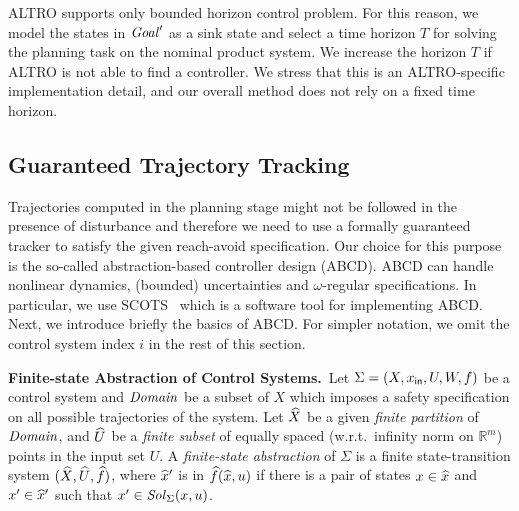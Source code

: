 \begin{remark}
	ALTRO supports only bounded horizon control problem.
	For this reason, we model the states in $\mathit{Goal}'$ as a sink state and select a time horizon $T$ for solving the planning task on the nominal product system. We increase the horizon $T$ if ALTRO is not able to find a controller.
	We stress that this is an ALTRO-specific implementation detail, and our overall method does not rely on a fixed time horizon.
\end{remark}



\subsection{Guaranteed Trajectory Tracking} 

Trajectories computed in the planning stage might not be followed in the presence of disturbance and therefore we need to use a 
formally guaranteed tracker to satisfy the given reach-avoid specification. 
Our choice for this purpose is the so-called abstraction-based controller design (ABCD). 
ABCD can handle nonlinear dynamics, (bounded) uncertainties and $\omega$-regular specifications. In particular, we use SCOTS~\cite{Rungger2016scots} which is a software tool for implementing ABCD. Next, we introduce briefly the basics of ABCD.
For simpler notation, we omit the control system index $i$ in the rest of this section.


\smallskip
\noindent\textbf{Finite-state Abstraction of Control Systems.}\
Let $\Sigma = (X,x_{\mathsf{in}}, U, W, f)$ be a control system and $\mathit{Domain}$ be a subset of $X$ which imposes a safety specification on all possible trajectories of the system. Let $\widehat{X}$ be a given \emph{finite partition} of $\mathit{Domain}$, and $\widehat{U}$ be a \emph{finite subset} of equally spaced (w.r.t.\ infinity norm on $\mathbb{R}^m$) points in the input set $U$.
A \emph{finite-state abstraction} of $\Sigma$ is a finite state-transition system $(\widehat{X},\widehat{U},\widehat{f})$, where $\widehat{x}'$ is in $\widehat{f}(\widehat{x},u)$ if there is a pair of states $x\in \widehat{x}$ and $x'\in \widehat{x}'$ such that $x'\in \mathit{Sol}_\Sigma(x,u)$.


